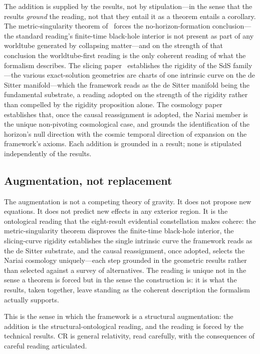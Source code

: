 \documentclass[11pt,a4paper]{article}
\theoremstyle{definition}
\begin{document}
The addition is supplied by the results, not by stipulation---in the sense that the results \emph{ground} the reading, not that they entail it as a theorem entails a corollary. The metric-singularity theorem of~\cite{JanzenBHcausality} forces the no-horizon-formation conclusion---the standard reading's finite-time black-hole interior is not present as part of any worldtube generated by collapsing matter---and on the strength of that conclusion the worldtube-first reading is the only coherent reading of what the formalism describes. The slicing paper~\cite{JanzenSlicing} establishes the rigidity of the SdS family---the various exact-solution geometries are charts of one intrinsic curve on the de Sitter manifold---which the framework reads as the de Sitter manifold being the fundamental substrate, a reading adopted on the strength of the rigidity rather than compelled by the rigidity proposition alone. The cosmology paper~\cite{JanzenCRcosmology} establishes that, once the causal reassignment is adopted, the Nariai member is the unique non-pivoting cosmological case, and grounds the identification of the horizon's null direction with the cosmic temporal direction of expansion on the framework's axioms. Each addition is grounded in a result; none is stipulated independently of the results.

\subsection{Augmentation, not replacement}\label{sec:not-replacement}

The augmentation is not a competing theory of gravity. It does not propose new equations. It does not predict new effects in any exterior region. It is the ontological reading that the eight-result evidential constellation makes cohere: the metric-singularity theorem disproves the finite-time black-hole interior, the slicing-curve rigidity establishes the single intrinsic curve the framework reads as the de Sitter substrate, and the causal reassignment, once adopted, selects the Nariai cosmology uniquely---each step grounded in the geometric results rather than selected against a survey of alternatives. The reading is unique not in the sense a theorem is forced but in the sense the construction is: it is what the results, taken together, leave standing as the coherent description the formalism actually supports.

This is the sense in which the framework is a structural augmentation: the addition is the structural-ontological reading, and the reading is forced by the technical results. CR is general relativity, read carefully, with the consequences of careful reading articulated.
\end{document}
